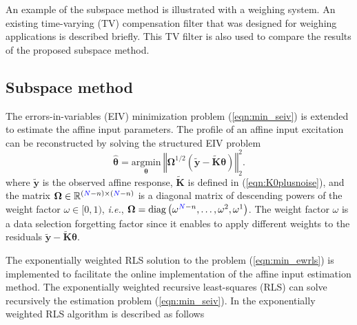 An example of the subspace method is illustrated with a weighing system.
An existing time-varying (TV) compensation filter that was designed for weighing applications is described briefly.
This TV filter is also used to compare the results of the proposed subspace method.


\subsection{Subspace method}
The errors-in-variables (EIV) minimization problem (\ref{eqn:min_seiv}) is extended to estimate the affine input parameters.
The profile of an affine input excitation can be reconstructed by solving the structured EIV problem  
\begin{equation} \widehat{\bm{\theta}} = \underset{\bm{\theta}}{\mathrm{argmin}} \ \left\Vert \bm{\Omega}^{1/2} \left( \widetilde{\mathbf{y}} - \widetilde{\mathbf{K}} \bm{\theta} \right) \right\Vert^2_2 . \label{eqn:min_ewrls} \end{equation}
where $\widetilde{\mathbf{y}}$ is the observed affine response, $\widetilde{\mathbf{K}}$ is defined in (\ref{eqn:K0plusnoise}), and
the matrix $\bm{\Omega} \in \mathbb{R}^{(\color{blue}N\color{black}-n) \times (\color{blue}N\color{black}-n)}$ is a diagonal matrix of descending powers of the weight factor $\omega \in [0, 1)$, \textit{i.e.},  $\bm{\Omega} = \mathrm{diag}\left(\omega^{\color{blue}N\color{black}-n}, \ldots, \omega^2, \omega^1 \right)$.
The weight factor $\omega$ is a data selection forgetting factor since it enables to apply different weights to the residuals $\widetilde{\mathbf{y}} - \widetilde{\mathbf{K}} \bm{\theta}$.

The exponentially weighted RLS solution to the problem (\ref{eqn:min_ewrls}) is implemented to facilitate the online implementation of the affine input estimation method.
\color{blue}
The exponentially weighted recursive least-squares (RLS) can solve recursively the estimation problem (\ref{eqn:min_seiv}).
In \citet{Kailath00book} the exponentially weighted RLS algorithm is described as follows

